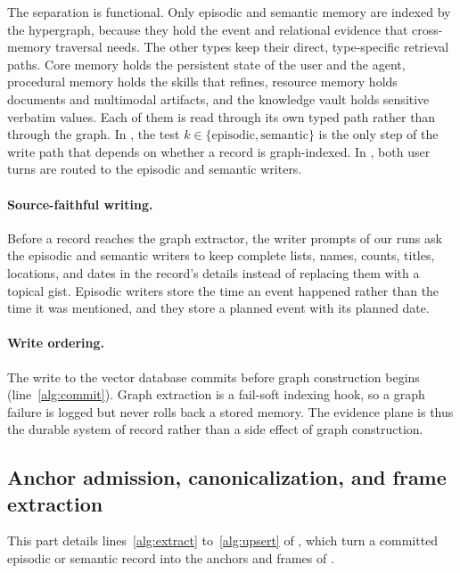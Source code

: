 The separation is functional. Only episodic and semantic memory are indexed by
the hypergraph, because they hold the event and relational evidence that
cross-memory traversal needs. The other types keep their direct, type-specific
retrieval paths. Core memory holds the persistent state of the user and the
agent, procedural memory holds the skills that  refines,
resource memory holds documents and multimodal artifacts, and the knowledge
vault holds sensitive verbatim values. Each of them is read through its own typed path rather than through the graph.
In , the test \(k\in\{\mathrm{episodic},\mathrm{semantic}\}\) is the only step of the write
path that depends on whether a record is graph-indexed. In , both user turns are
routed to the episodic and semantic writers.

\paragraph{Source-faithful writing.}
Before a record reaches the graph extractor, the writer prompts of our runs ask
the episodic and semantic writers to keep complete lists, names, counts, titles,
locations, and dates in the record's details instead of replacing them with a
topical gist. Episodic writers store the time an event happened rather than the
time it was mentioned, and they store a planned event with its planned date.

\paragraph{Write ordering.}
The write to the vector database commits before graph construction begins
(line~\ref{alg:commit}). Graph extraction
is a fail-soft indexing hook, so a graph failure is logged but never rolls back
a stored memory. The evidence plane is thus the durable system of record rather
than a side effect of graph construction.

\subsection{Anchor admission, canonicalization, and frame extraction}
\label{app:method-graph}

This part details lines~\ref{alg:extract} to~\ref{alg:upsert} of
, which turn a committed episodic or semantic record into the
anchors and frames of .

